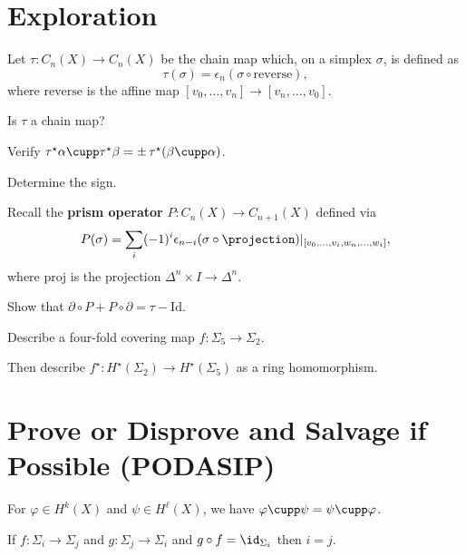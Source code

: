 \documentclass{homework}
\begin{document}
\section{Exploration}

\begin{problem}
Let $\tau : C_n(X) \to C_n(X)$ be the chain map which, on a simplex $\sigma$, is defined as
\[
\tau(\sigma) = \epsilon_n (\sigma \circ \mathrm{reverse}),
\]
where $\mathrm{reverse}$ is the affine map $[v_0,\ldots,v_n] \to
[v_n,\ldots,v_0]$.

Is $\tau$ a chain map?
\end{problem}

\begin{problem}
  Verify $\tau^\star \alpha \cupp \tau^\star \beta = \pm
  \,\tau^\star(\beta \cupp \alpha)$.

  Determine the sign.
\end{problem}


\begin{problem}
 Recall the \textbf{prism
    operator} $P : C_n(X) \to C_{n+1}(X)$ defined via
  \[
  P(\sigma) = \sum_i (-1)^i \epsilon_{n-i} (\sigma \circ \projection)
  |_{[v_0,\ldots,v_i,w_n,\ldots, w_i]},
  \]
  where $\mathrm{proj}$ is the projection $\Delta^n \times I \to \Delta^n$.

  Show that $\partial \circ P + P \circ \partial = \tau - \mathrm{Id}$.
\end{problem}

\begin{problem} Describe a four-fold covering map $f : \Sigma_5 \to
  \Sigma_2$.

  Then describe $f^\star : H^\star(\Sigma_2) \to H^\star(\Sigma_5)$ as a ring homomorphism.
\end{problem}

\section{Prove or Disprove and Salvage if Possible (PODASIP)}

\begin{problem}
  For $\varphi \in H^k(X)$ and $\psi \in H^\ell(X)$, we have \(\varphi \cupp \psi = \psi \cupp \varphi\).
\end{problem}

\begin{problem} If $f : \Sigma_i \to \Sigma_j$ and $g :
\Sigma_j \to \Sigma_i$ and $g \circ f = \id_{\Sigma_i}$ then $i =
j$.
\end{problem}
\end{document}
